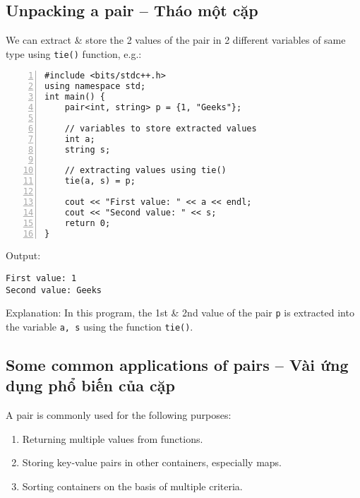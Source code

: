 \documentclass{article}
\begin{document}

\subsection{Unpacking a pair -- Tháo một cặp}
We can extract \& store the 2 values of the pair in 2 different variables of same type using {\tt tie()} function, e.g.:
\begin{Verbatim}[numbers=left,xleftmargin=5mm]
#include <bits/stdc++.h>
using namespace std;
int main() {
    pair<int, string> p = {1, "Geeks"};
	
    // variables to store extracted values
    int a;
    string s;
	
    // extracting values using tie()
    tie(a, s) = p;
	
    cout << "First value: " << a << endl;
    cout << "Second value: " << s;
    return 0;
}
\end{Verbatim}
Output:
\begin{verbatim}
First value: 1
Second value: Geeks
\end{verbatim}
Explanation: In this program, the 1st \& 2nd value of the pair {\tt p} is extracted into the variable {\tt a, s} using the function {\tt tie()}.


\subsection{Some common applications of pairs -- Vài ứng dụng phổ biến của cặp}
A pair is commonly used for the following purposes:
\begin{enumerate}
	\item Returning multiple values from functions.
	\item Storing key-value pairs in other containers, especially maps.
	\item Sorting containers on the basis of multiple criteria.
\end{enumerate}

\end{document}
